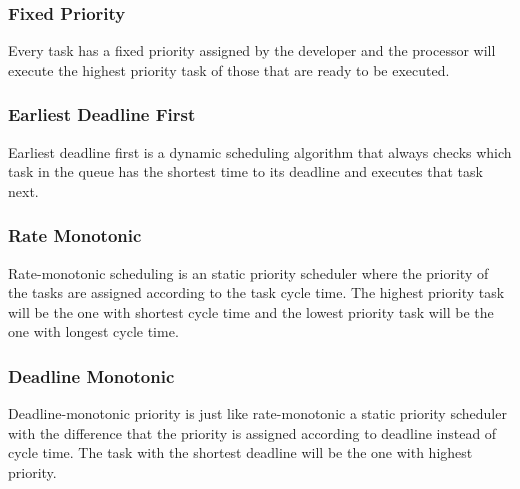 \subsubsection{Fixed Priority}
Every task has a fixed priority assigned by the developer and the processor will execute the highest priority task of those that are ready to be executed. 
\subsubsection{Earliest Deadline First}
Earliest deadline first is a dynamic scheduling algorithm that always checks which task in the queue has the shortest time to its deadline and executes that task next.
\subsubsection{Rate Monotonic}
Rate-monotonic scheduling is an static priority scheduler where the priority of the tasks are assigned according to the task cycle time. The highest priority task will be the one with shortest cycle time and the lowest priority task will be the one with longest cycle time.
\subsubsection{Deadline Monotonic}
Deadline-monotonic priority is just like rate-monotonic a static priority scheduler with the difference that the priority is assigned according to deadline instead of cycle time. The task with the shortest deadline will be the one with highest priority.